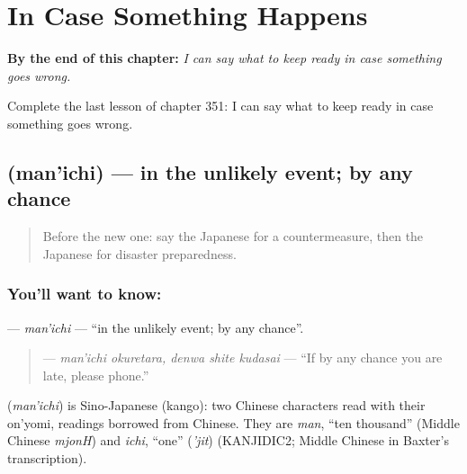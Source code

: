 
\chapter{In Case Something Happens}
\label{ch:ja-in-case-something-happens}

\begin{chapteropening}
\textbf{By the end of this chapter:} \emph{I can say what to keep ready in case something goes wrong.}

Complete the last lesson of chapter 351: I can say what to keep ready in case something goes wrong.
\end{chapteropening}

\section[\texorpdfstring{\ja{まんいち} (man'ichi)}{まんいち (man'ichi)}]{ (man'ichi) — in the unlikely event; by any chance}

\label{lesson:JA-C351-man-ichi}



\begin{quote}
Before the new one: say the Japanese for a countermeasure, then the Japanese for disaster preparedness.
\end{quote}

\subsection*{You'll want to know: }
\textbf{} — \emph{man'ichi} — \textquotedblleft{}in the unlikely event; by any chance\textquotedblright{}.

\begin{quote}
\textbf{  } — \emph{man'ichi okuretara, denwa shite kudasai} — \textquotedblleft{}If by any chance you are late, please phone.\textquotedblright{}
\end{quote}

\begin{cousinweb}
\textbf{} (\emph{man'ichi}) is Sino-Japanese (kango): two Chinese characters read with their on'yomi, readings borrowed from Chinese. They are \emph{man}, \textquotedblleft{}ten thousand\textquotedblright{} (Middle Chinese \emph{mjonH}) and \emph{ichi}, \textquotedblleft{}one\textquotedblright{} (\emph{'jit}) (KANJIDIC2; Middle Chinese in Baxter's transcription).
\end{cousinweb}

